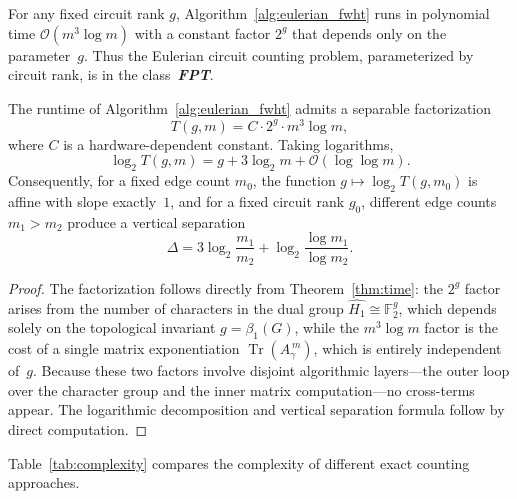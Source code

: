 \documentclass[acmsmall,review]{acmart}
\newcommand{\bigO}{\mathcal{O}}
\newcommand{\F}{\mathbb{F}_2}
\DeclareMathOperator{\Tr}{Tr}
\begin{document}
	\begin{corollary}
		\label{cor:fpt}
		For any fixed circuit rank $g$, Algorithm~\ref{alg:eulerian_fwht} runs in polynomial time $\bigO(m^3 \log m)$ with a constant factor $2^g$ that depends only on the parameter~$g$. Thus the Eulerian circuit counting problem, parameterized by circuit rank, is in the class~\emph{\textbf{FPT}}.
	\end{corollary}
	
	\begin{proposition}
		\label{prop:separable}
		The runtime of Algorithm~\ref{alg:eulerian_fwht} admits a separable factorization
		\begin{equation}
			T(g,m) = C \cdot 2^{g} \cdot m^{3}\log m,
			\label{eq:complexity_factored}
		\end{equation}
		where $C$ is a hardware-dependent constant. Taking logarithms,
		\begin{equation}
			\log_2 T(g,m) = g + 3\log_2 m + \bigO(\log\log m).
			\label{eq:log_linear}
		\end{equation}
		Consequently, for a fixed edge count $m_0$, the function $g \mapsto \log_2 T(g, m_0)$ is affine with slope exactly~$1$, and for a fixed circuit rank $g_0$, different edge counts $m_1 > m_2$ produce a vertical separation
		\begin{equation}
			\Delta = 3\log_2 \frac{m_1}{m_2} + \log_2\frac{\log m_1}{\log m_2}.
		\end{equation}
	\end{proposition}
	\begin{proof}
		The factorization follows directly from Theorem~\ref{thm:time}: the $2^g$ factor arises from the number of characters in the dual group $\widehat{H_1} \cong \F^g$, which depends solely on the topological invariant $g = \beta_1(G)$, while the $m^3 \log m$ factor is the cost of a single matrix exponentiation $\Tr(A_\gamma^{\,m})$, which is entirely independent of~$g$. Because these two factors involve disjoint algorithmic layers---the outer loop over the character group and the inner matrix computation---no cross-terms appear. The logarithmic decomposition and vertical separation formula follow by direct computation.
	\end{proof}
	
	Table~\ref{tab:complexity} compares the complexity of different exact counting approaches.
	
\end{document}

